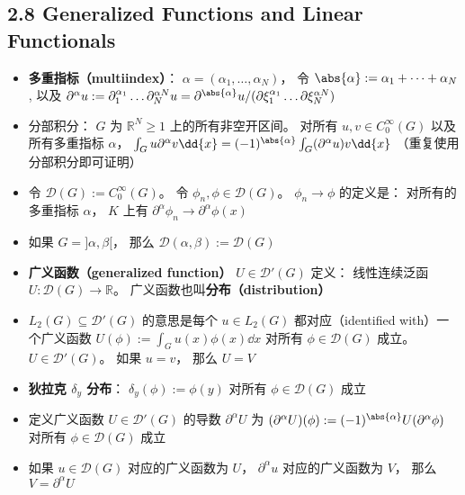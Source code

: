 \subsection{2.8 Generalized Functions and Linear Functionals}
\begin{itemize}
\item \textbf{多重指标（multiindex）}： $\alpha = (\alpha_1, \dots, \alpha_N)$， 令 $\abs{\alpha} := \alpha_1 + \dots + \alpha_N$, 以及 $\partial^\alpha u := \partial_1^{\alpha_1} \dots \partial_N^{\alpha N} u = \partial^{\abs{\alpha}} u/ (\partial\xi_1^{\alpha_1} \dots \partial\xi_N^{\alpha N})$

\item 分部积分： $G$ 为 $\mathbb R^N \ge 1$ 上的所有非空开区间。 对所有 $u, v \in C_0^\infty(G)$ 以及所有多重指标 $\alpha$， $\int_G u\partial^\alpha v \dd{x} = (-1)^{\abs{\alpha}} \int_G (\partial^\alpha u)v \dd{x}$ （重复使用分部积分即可证明）

\item 令 $\mathcal D(G) := C_0^\infty(G)$。 令 $\phi_n, \phi \in \mathcal D(G)$。 $\phi_n \to \phi$ 的定义是： 对所有的多重指标 $\alpha$， $K$ 上有 $\partial^\alpha \phi_n \to \partial^\alpha \phi(x)$

\item 如果 $G = ]\alpha,\beta[$， 那么 $\mathcal D(\alpha,\beta) := \mathcal D(G)$

\item \textbf{广义函数（generalized function）} $U \in \mathcal D'(G)$ 定义： 线性连续泛函 $U: \mathcal D(G) \to \mathbb R$。 广义函数也叫\textbf{分布（distribution）}

\item $L_2(G) \subseteq \mathcal D'(G)$ 的意思是每个 $u\in L_2(G)$ 都对应（identified with）一个广义函数 $U(\phi) := \int_G u(x) \phi(x) \dd{x}$ 对所有 $\phi \in \mathcal D(G)$ 成立。 $U \in \mathcal D'(G)$。 如果 $u = v$， 那么 $U = V$

\item \textbf{狄拉克 $\delta_y$ 分布}： $\delta_y(\phi) := \phi(y)$ 对所有 $\phi\in\mathcal D(G)$ 成立

\item 定义广义函数 $U \in \mathcal D'(G)$ 的导数 $\partial^\alpha U$ 为 $(\partial^\alpha U)(\phi) := (-1)^{\abs{\alpha}} U(\partial^\alpha \phi)$ 对所有 $\phi\in\mathcal D(G)$ 成立

\item 如果 $u \in\mathcal D(G)$ 对应的广义函数为 $U$， $\partial^\alpha u$ 对应的广义函数为 $V$， 那么 $V = \partial^\alpha U$


\end{itemize}
